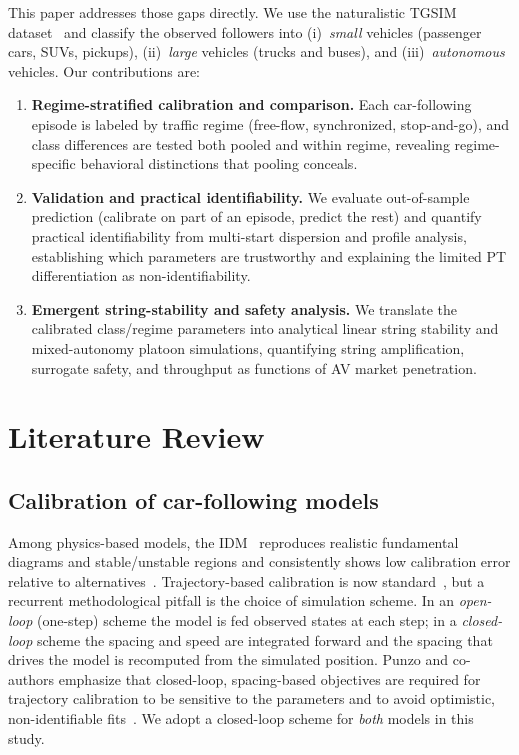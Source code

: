 \documentclass[11pt]{article}
\begin{document}
This paper addresses those gaps directly. We use the naturalistic TGSIM
dataset~\cite{ammourah2024} and classify the observed followers into
(i)~\emph{small} vehicles (passenger cars, SUVs, pickups), (ii)~\emph{large}
vehicles (trucks and buses), and (iii)~\emph{autonomous} vehicles. Our
contributions are:
\begin{enumerate}
\item \textbf{Regime-stratified calibration and comparison.} Each car-following
episode is labeled by traffic regime (free-flow, synchronized, stop-and-go), and
class differences are tested both pooled and within regime, revealing
regime-specific behavioral distinctions that pooling conceals.
\item \textbf{Validation and practical identifiability.} We evaluate
out-of-sample prediction (calibrate on part of an episode, predict the rest) and
quantify practical identifiability from multi-start dispersion and profile
analysis, establishing which parameters are trustworthy and explaining the
limited PT differentiation as non-identifiability.
\item \textbf{Emergent string-stability and safety analysis.} We translate the
calibrated class/regime parameters into analytical linear string stability and
mixed-autonomy platoon simulations, quantifying string amplification, surrogate
safety, and throughput as functions of AV market penetration.
\end{enumerate}

\section{Literature Review}
\subsection{Calibration of car-following models}
Among physics-based models, the IDM~\cite{treiber2000} reproduces realistic
fundamental diagrams and stable/unstable regions and consistently shows low
calibration error relative to alternatives~\cite{zhu2018,pourabdollah2018}.
Trajectory-based calibration is now standard~\cite{punzo2005}, but a recurrent
methodological pitfall is the choice of simulation scheme. In an \emph{open-loop}
(one-step) scheme the model is fed observed states at each step; in a
\emph{closed-loop} scheme the spacing and speed are integrated forward and the
spacing that drives the model is recomputed from the simulated position. Punzo and
co-authors emphasize that closed-loop, spacing-based objectives are required for
trajectory calibration to be sensitive to the parameters and to avoid optimistic,
non-identifiable fits~\cite{punzo2012,montanino2015}. We adopt a closed-loop
scheme for \emph{both} models in this study.
\end{document}
